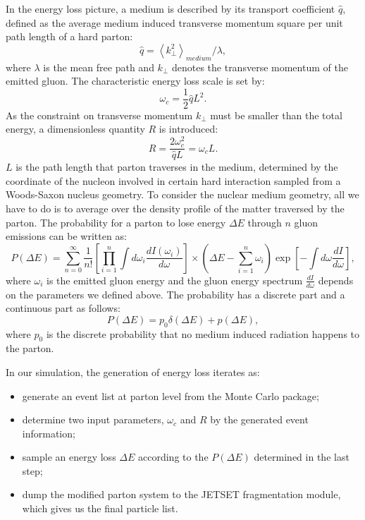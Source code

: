 In the energy loss picture, a medium is described by its transport coefficient $\hat{q}$,
defined as the average medium induced transverse momentum square per unit path
length of a hard parton:
\begin{equation}
\hat{q} = \left\langle k^{2}_{\perp}\right\rangle _{medium}/\lambda,
\end{equation}
where $\lambda$ is the mean free path and $k_{\perp}$ denotes the transverse
momentum of the emitted gluon. The characteristic energy loss scale is set by:
\begin{equation}
\omega_{c} = \frac{1}{2}\hat{q}L^{2}.
\end{equation}
As the constraint on transverse momentum $k_{\perp}$ must be smaller than the
total energy, a dimensionless quantity $R$ is introduced:
\begin{equation}
R = \frac{2\omega^{2}_{c}}{\hat{q}L} = \omega_{c}L.
\end{equation}
$L$ is the path length that parton traverses in the medium, determined by the
coordinate of the nucleon involved in certain hard interaction sampled from
a Woods-Saxon nucleus geometry. To consider the nuclear medium geometry, all we
have to do is to average over the density profile of the matter traversed by the
parton. The probability for a parton to lose energy $\Delta E$ through $n$ gluon emissions can be
written as:
\begin{equation}
P(\Delta E)=\sum^{\infty}_{n=0}\frac{1}{n!}[\prod^{n}_{i=1}\int d\omega_{i}\frac{dI(\omega_{i})}{d\omega}]
\times(\Delta E-\sum^{n}_{i=1}\omega_{i})\exp[-\int d\omega\frac{dI}{d\omega}],
\end{equation}
where $\omega_{i}$ is the emitted gluon energy and the gluon energy spectrum $\frac{dI}{d\omega}$
depends on the parameters we defined above. The probability has a discrete part and
a continuous part as follows:
\begin{equation}
P(\Delta E) = p_{0}\delta(\Delta E) + p(\Delta E),
\end{equation}
where $p_{0}$ is the discrete probability that no medium induced radiation
happens to the parton.

In our simulation, the generation of energy loss iterates as:
\begin{itemize}
	\item generate an event list at parton level from the Monte Carlo package;
	\item determine two input parameters, $\omega_{c}$ and $R$ by the generated event information;
	\item sample an energy loss $\Delta E$ according to the $P(\Delta E)$ determined in the last step;
	\item dump the modified parton system to the JETSET fragmentation module, which gives us the final particle list.
\end{itemize}

